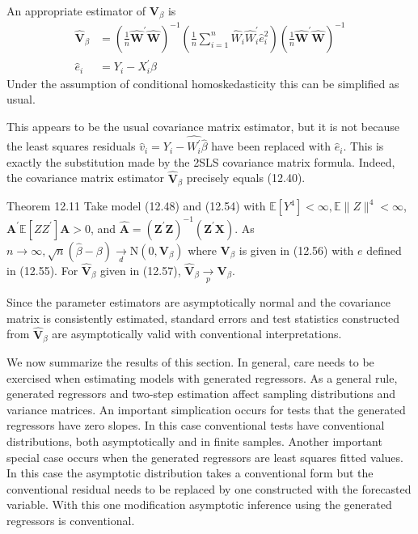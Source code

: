 \documentclass[10pt]{article}
\begin{document}
An appropriate estimator of $\boldsymbol{V}_{\beta}$ is
$$
\begin{aligned}
\widehat{\boldsymbol{V}}_{\beta} &=\left(\frac{1}{n} \widehat{\boldsymbol{W}}^{\prime} \widehat{\boldsymbol{W}}\right)^{-1}\left(\frac{1}{n} \sum_{i=1}^{n} \widehat{W}_{i} \widehat{W}_{i}^{\prime} \widehat{e}_{i}^{2}\right)\left(\frac{1}{n} \widehat{\boldsymbol{W}}^{\prime} \widehat{\boldsymbol{W}}\right)^{-1} \\
\widehat{e}_{i} &=Y_{i}-X_{i}^{\prime} \widehat{\beta}
\end{aligned}
$$
Under the assumption of conditional homoskedasticity this can be simplified as usual.

This appears to be the usual covariance matrix estimator, but it is not because the least squares residuals $\widehat{v}_{i}=Y_{i}-\widehat{W_{i}^{\prime}} \widehat{\beta}$ have been replaced with $\widehat{e}_{i}$. This is exactly the substitution made by the 2SLS covariance matrix formula. Indeed, the covariance matrix estimator $\widehat{\boldsymbol{V}}_{\beta}$ precisely equals (12.40).

Theorem 12.11 Take model (12.48) and (12.54) with $\mathbb{E}\left[Y^{4}\right]<\infty, \mathbb{E}\|Z\|^{4}<\infty$, $\boldsymbol{A}^{\prime} \mathbb{E}\left[Z Z^{\prime}\right] \boldsymbol{A}>0$, and $\widehat{\boldsymbol{A}}=\left(\boldsymbol{Z}^{\prime} \boldsymbol{Z}\right)^{-1}\left(\boldsymbol{Z}^{\prime} \boldsymbol{X}\right)$. As $n \rightarrow \infty, \sqrt{n}(\widehat{\beta}-\beta) \underset{d}{\rightarrow} \mathrm{N}\left(0, \boldsymbol{V}_{\beta}\right)$ where $\boldsymbol{V}_{\beta}$ is given in (12.56) with $e$ defined in (12.55). For $\widehat{\boldsymbol{V}}_{\beta}$ given in (12.57), $\widehat{\boldsymbol{V}}_{\beta} \underset{p}{\longrightarrow} \boldsymbol{V}_{\beta}$.

Since the parameter estimators are asymptotically normal and the covariance matrix is consistently estimated, standard errors and test statistics constructed from $\widehat{\boldsymbol{V}}_{\beta}$ are asymptotically valid with conventional interpretations.

We now summarize the results of this section. In general, care needs to be exercised when estimating models with generated regressors. As a general rule, generated regressors and two-step estimation affect sampling distributions and variance matrices. An important simplication occurs for tests that the generated regressors have zero slopes. In this case conventional tests have conventional distributions, both asymptotically and in finite samples. Another important special case occurs when the generated regressors are least squares fitted values. In this case the asymptotic distribution takes a conventional form but the conventional residual needs to be replaced by one constructed with the forecasted variable. With this one modification asymptotic inference using the generated regressors is conventional.
\end{document}
